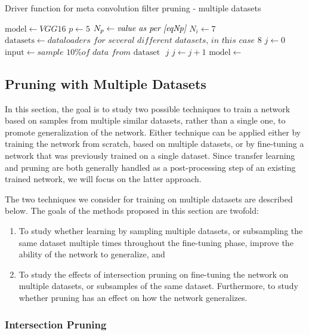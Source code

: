 \documentclass{article}
\begin{document}
\begin{algorithm}[t]
	\caption{Driver function for meta convolution filter pruning - multiple datasets} \label{FilterPruneDriverMeta}
	\begin{algorithmic}[1]	
		\State $\mathrm{model} \gets \textit{VGG16}$
		\State $p \gets 5$
		\State $N_p \gets \textit{value as per \eqref{eqNp}}$
		\State $N_i \gets 7$
		\State $\mathrm{datasets} \gets \textit{dataloaders for several different datasets, in this case $8$}$
		\State $j \gets 0$
				\State $\mathrm{input} \gets \textit{sample 10\% of data from $\mathrm{dataset}$ }j$
				\State $j \gets j + 1$
			\EndIf
			\State $\mathrm{model} \gets $ 
		\EndWhile
	\end{algorithmic}
\end{algorithm}

\subsection{Pruning with Multiple Datasets}

In this section, the goal is to study two possible techniques to train a network based on samples from multiple similar datasets, rather than a single one, to promote generalization of the network. Either technique can be applied either by training the network from scratch, based on multiple datasets, or by fine-tuning a network that was previously trained on a single dataset. Since transfer learning and pruning are both generally handled as a post-processing step of an existing trained network, we will focus on the latter approach. 

The two techniques we consider for training on multiple datasets are described below.
%
The goals of the methods proposed in this section are twofold:
\begin{enumerate}
	\item To study whether learning by sampling multiple datasets, or subsampling the same dataset multiple times throughout the fine-tuning phase, improve the ability of the network to generalize, and
	\item To study the effects of intersection pruning on fine-tuning the network on multiple datasets, or subsamples of the same dataset. Furthermore, to study whether pruning has an effect on how the network generalizes.
\end{enumerate}

\subsubsection{Intersection Pruning} \label{intersectPruneClass} \label{intersectPruneFilter}
\end{document}
